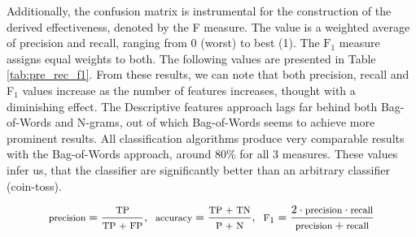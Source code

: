 		Additionally, the confusion matrix is instrumental for the construction of the derived effectiveness, denoted by the F measure. The value is a weighted average of precision and recall, ranging from 0 (worst) to best (1). The $ \text{F}_1 $ measure assigns equal weights to both. The following values are presented in Table \ref{tab:pre_rec_f1}. From these results, we can note that both precision, recall and F$_1$ values increase as the number of features increases, thought with a diminishing effect. The Descriptive features approach lags far behind both Bag-of-Words and N-grams, out of which Bag-of-Words seems to achieve more prominent results. All classification algorithms produce very comparable results with the Bag-of-Words approach, around 80\% for all 3 measures. These values infer us, that the classifier are significantly better than an arbitrary classifier (coin-toss).
		
		\begin{equation}
			\footnotesize
				\text{precision} = \frac{\text{TP}}{\text{TP + FP}}, \ \
				\text{accuracy} = \frac{\text{TP + TN}}{\text{P + N}}, \ \
				\text{F}_1 = \frac{2 \cdot \text{precision} \cdot \text{recall}}{\text{precision} + \text{recall}}
		\label{precision}
		\end{equation}
		
